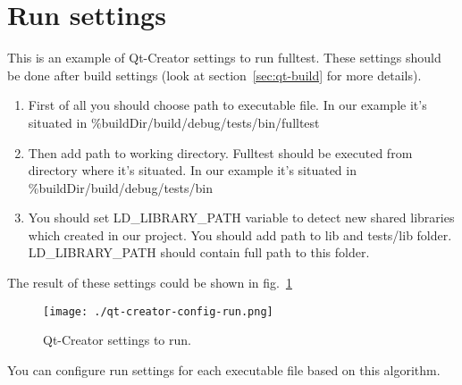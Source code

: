 \section{Run settings}

This is an example of Qt-Creator settings to run fulltest. These settings should be done after build settings (look at section~\ref{sec:qt-build} for more details).

\begin{enumerate}
  \item First of all you should choose path to executable file. In our example it's situated in \%{buildDir}/build/debug/tests/bin/fulltest
  \item Then add path to working directory. Fulltest should be executed from directory where it's situated. In our example it's situated in \%{buildDir}/build/debug/tests/bin
  \item You should set LD\_LIBRARY\_PATH variable to detect new shared libraries which created in our project. You should add path to lib and tests/lib folder. LD\_LIBRARY\_PATH should contain full path to this folder.
\end{enumerate}

The result of these settings could be shown in fig.~\ref{fig:qt-creator-config-run}

\begin{figure}[ht]
  \centering
  \texttt{[image: ./qt-creator-config-run.png]}
  \caption{Qt-Creator settings to run.}
  \label{fig:qt-creator-config-run}
\end{figure}

You can configure run settings for each executable file based on this algorithm.

\printindex


